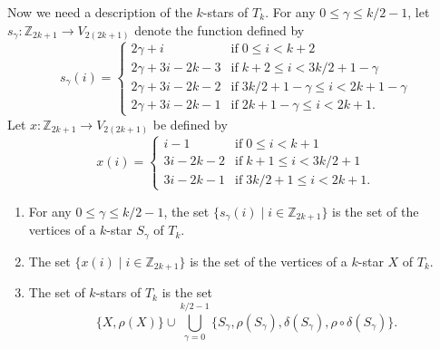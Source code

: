 \documentclass[12pt]{amsart}
\begin{document}
Now we need a description of the $k$-stars of $T_k$. For any $0\le\gamma\le k/2-1$, let $s_\gamma:\mathbb{Z}_{2k+1}\to V_{2(2k+1)}$ denote the function defined by
$$s_{\gamma}(i)=\left\{\begin{array}{ll}
2\gamma+i  &  \mathrm{if}\;0\le i< k+2 \\
2\gamma+3i-2k-3  &  \mathrm{if}\;k+2\le i< 3k/2+1-\gamma \\
2\gamma+3i-2k-2  &  \mathrm{if}\;3k/2+1-\gamma\le i< 2k+1-\gamma \\
2\gamma+3i-2k-1  &  \mathrm{if}\;2k+1-\gamma\le i< 2k+1.
\end{array}\right.$$
Let $x:\mathbb{Z}_{2k+1}\to V_{2(2k+1)}$ be defined by
$$x(i)=\left\{\begin{array}{ll}
i-1  &  \mathrm{if}\;0\le i< k+1 \\
3i-2k-2  &  \mathrm{if}\;k+1\le i< 3k/2+1 \\
3i-2k-1  &  \mathrm{if}\;3k/2+1\le i< 2k+1.
\end{array}\right.$$

\begin{lemma}
\begin{enumerate}
\item For any $0\le\gamma\le k/2-1$, the set $\{s_{\gamma}(i)\;|\; i\in\mathbb{Z}_{2k+1}\}$ is the set of the vertices of a $k$-star $S_{\gamma}$ of $T_k$.
\item The set $\{x(i)\;|\; i\in\mathbb{Z}_{2k+1}\}$ is the set of the vertices of a $k$-star $X$ of $T_k$.
\item The set of $k$-stars of $T_k$ is the set
$$\{X,\rho(X)\}\cup\bigcup_{\gamma=0}^{k/2-1}\{S_{\gamma}, \rho(S_{\gamma}),\delta(S_{\gamma}),\rho\circ\delta(S_{\gamma})\}.$$
\end{enumerate}
\end{lemma}
\end{document}
